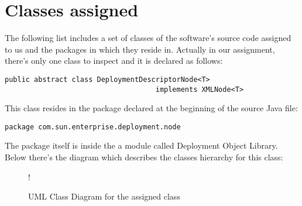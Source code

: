 \break
\section{Classes assigned}
The following list includes a set of classes of the software's source code assigned to us and the packages in which they reside in.
Actually in our assignment, there's only one class to inspect and it is declared as follows:
\begin{lstlisting}
public abstract class DeploymentDescriptorNode<T> 
									implements XMLNode<T>
\end{lstlisting}
This class resides in the package declared at the beginning of the source Java file:
\begin{lstlisting}
package com.sun.enterprise.deployment.node
\end{lstlisting}
The package itself is inside the a module called Deployment Object Library.
Below there's the diagram which describes the classes hierarchy for this class:
\begin{figure}[H]
	\centering
	\resizebox{2.5in}
	{!}{}
	\caption{UML Class Diagram for the assigned class}
\end{figure}